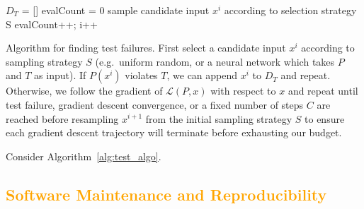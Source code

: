 \documentclass[12pt,initial,twoside,maitrise]{dms}
\newcommand{\mediumrare}[1]{\textcolor{orange}{#1}}
\numberwithin{equation}{section}
\numberwithin{table}{chapter}
\numberwithin{figure}{chapter}
\begin{document}
\begin{algorithm}

    $D_T$ = []\;
    evalCount = 0\;
     {
    sample candidate input $x^i$ according to selection strategy S\;
    evalCount++; i++\;
    }

    \caption{Algorithm for finding test failures. First select a candidate input $x^i$ according to sampling strategy $S$ (e.g.\ uniform random, or a neural network which takes $P$ and $T$ as input). If $P(x^i)$ violates $T$, we can append $x^i$ to $D_T$ and repeat. Otherwise, we follow the gradient of $\mathcal{L}(P, x)$ with respect to $x$ and repeat until test failure, gradient descent convergence, or a fixed number of steps $C$ are reached before resampling $x^{i+1}$ from the initial sampling strategy $S$ to ensure each gradient descent trajectory will terminate before exhausting our budget.}
    \label{alg:test_algo}
\end{algorithm}

Consider Algorithm~\ref{alg:test_algo}.




\mediumrare{\chapter{Software Maintenance and Reproducibility}\label{ch:ducker}}
\end{document}

